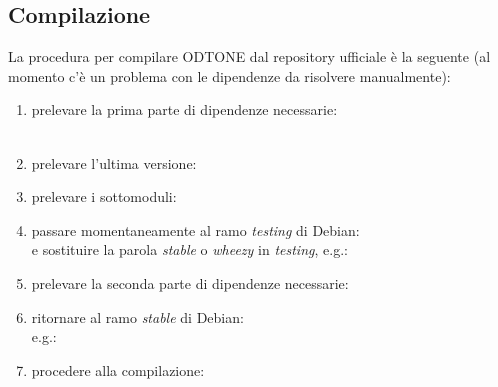 \subsection{Compilazione}
La procedura per compilare ODTONE dal repository ufficiale è la seguente (al momento c'è un problema con le dipendenze da risolvere manualmente\cite{snapshot}):\\
\begin{enumerate}

\item prelevare la prima parte di dipendenze necessarie:\\
\\

\item prelevare l'ultima versione:\\

\item prelevare i sottomoduli:\\

\item passare momentaneamente al ramo {\em testing} di Debian:\\
e sostituire la parola {\em stable} o {\em wheezy} in {\em testing}, e.g.:\\

\item prelevare la seconda parte di dipendenze necessarie:\\

\item ritornare al ramo {\em stable} di Debian:\\
e.g.:\\

\item procedere alla compilazione:\\

\end{enumerate}

